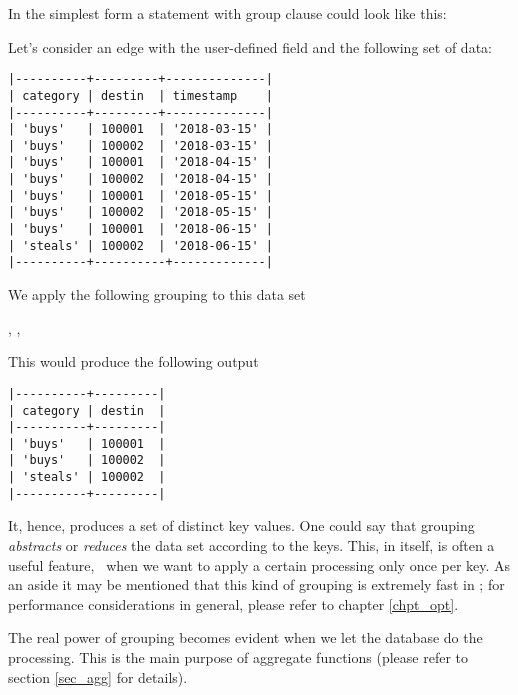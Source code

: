 In the simplest form a statement with
group clause could look like this:

 
 
 

Let's consider an edge with the
user-defined field 
and the following set of data:

\begin{minipage}{\textwidth}
\begin{verbatim}
|----------+---------+--------------|
| category | destin  | timestamp    |
|----------+---------+--------------|
| 'buys'   | 100001  | '2018-03-15' |
| 'buys'   | 100002  | '2018-03-15' |
| 'buys'   | 100001  | '2018-04-15' |
| 'buys'   | 100002  | '2018-04-15' |
| 'buys'   | 100001  | '2018-05-15' |
| 'buys'   | 100002  | '2018-05-15' |
| 'buys'   | 100001  | '2018-06-15' |
| 'steals' | 100002  | '2018-06-15' |
|----------+----------+-------------|
\end{verbatim}
\end{minipage}

We apply the following grouping to this data set

 ,
 
 , 

This would produce the following output

\begin{minipage}{\textwidth}
\begin{verbatim}
|----------+---------|
| category | destin  |
|----------+---------|
| 'buys'   | 100001  |
| 'buys'   | 100002  |
| 'steals' | 100002  |
|----------+---------|
\end{verbatim}
\end{minipage}

It, hence, produces a set of distinct key values.
One could say that grouping \emph{abstracts} or \emph{reduces}
the data set according to the keys.
This, in itself, is often a useful feature,
\viz\ when we want to apply a certain processing
only once per key. As an aside it may be mentioned
that this kind of grouping is extremely fast in \nowdb;
for performance considerations in general, please
refer to chapter \ref{chpt_opt}.

The real power of grouping becomes evident
when we let the database do the processing.
This is the main purpose of aggregate functions
(please refer to section \ref{sec_agg} for details).


